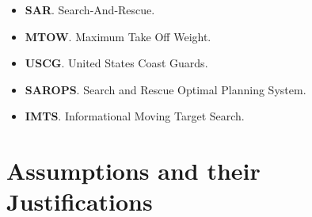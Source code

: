 \documentclass[12pt, letterpaper]{article}  %
\theoremstyle{definition}
\theoremstyle{remark}
\theoremstyle{plain}
\begin{document}
\begin{itemize}
\item \textbf{SAR}. Search-And-Rescue.

\item \textbf{MTOW}. Maximum Take Off Weight.

\item \textbf{USCG}. United States Coast Guards.
\item \textbf{SAROPS}. Search and Rescue Optimal Planning System.
\item \textbf{IMTS}. Informational Moving Target Search.


\end{itemize}


\section{Assumptions and their Justifications}\label{sec:assumptions}
\end{document}
